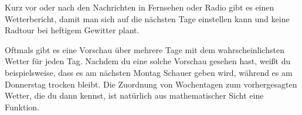\documentclass[../../main.tex]{subfiles}
\begin{document}
\begin{example}{}
    Kurz vor oder nach den Nachrichten in Fernsehen oder Radio gibt es einen Wetterbericht, damit man sich auf die nächsten Tage einstellen kann und keine Radtour bei heftigem Gewitter plant.
    
    Oftmals gibt es eine Vorschau über mehrere Tage mit dem wahrscheinlichsten Wetter für jeden Tag. Nachdem du eine solche Vorschau gesehen hast, weißt du beispielsweise, dass es am nächsten Montag Schauer geben wird, während es am Donnerstag trocken bleibt. Die Zuordnung von Wochentagen zum vorhergesagten Wetter, die du dann kennst, ist natürlich aus mathematischer Sicht eine Funktion.
    

\end{example}
\end{document}
